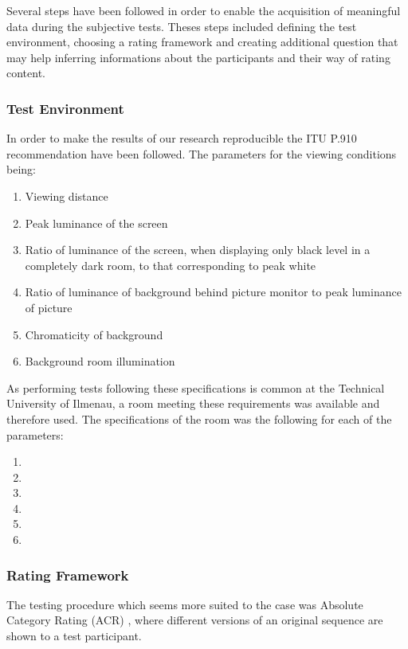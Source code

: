 Several steps have been followed in order to enable the acquisition of meaningful data during the subjective tests. Theses steps included defining the test environment, choosing a rating framework and creating additional question that may help inferring informations about the participants and their way of rating content.

\subsubsection{Test Environment}
In order to make the results of our research reproducible the ITU P.910 recommendation \cite{rec1998p} have been followed. 
The parameters for the viewing conditions being:
\begin{enumerate}[a:]
	\item Viewing distance
	\item Peak luminance of the screen
	\item Ratio of luminance of the screen, when displaying only black level in a
	completely dark room, to that corresponding to peak white
	\item Ratio of luminance of background behind picture monitor to peak luminance of picture
	\item Chromaticity of background
	\item Background room illumination
\end{enumerate}

As performing tests following these specifications is common at the Technical University of Ilmenau, a room meeting these requirements was available and therefore used.
The specifications of the room was the following for each of the parameters:
\begin{enumerate}[a:]
	\item
	\item
	\item
	\item
	\item
	\item
\end{enumerate}

	
\subsubsection{Rating Framework}
The testing procedure which seems more suited to the case was Absolute Category Rating (ACR) \cite{rec1998p}, where different versions of an original sequence are shown to a test participant. 

